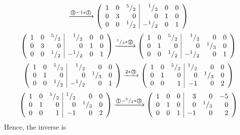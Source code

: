 \documentclass[8pt]{article} %
\begin{document}
\begin{enumerate}[1]
\begin{enumerate}[(a)]
\[\xrightarrow{\text{\textcircled{3}$-1*$\textcircled{1}}}\left(\begin{array}{rrr|rrr}
1&0&{^{5}/_{2}}&{^{1}/_{2}}&0&0\\
0&3&0&0&1&0\\
0&0&{^{1}/_{2}}&-{^{1}/_{2}}&0&1\\
\end{array}\right)
\]\[\left(\begin{array}{rrr|rrr}
1&0&{^{5}/_{2}}&{^{1}/_{2}}&0&0\\
0&3&0&0&1&0\\
0&0&{^{1}/_{2}}&-{^{1}/_{2}}&0&1\\
\end{array}\right)
\xrightarrow{\text{${^{1}/_{3}}*$\textcircled{2}}}\left(\begin{array}{rrr|rrr}
1&0&{^{5}/_{2}}&{^{1}/_{2}}&0&0\\
0&1&0&0&{^{1}/_{3}}&0\\
0&0&{^{1}/_{2}}&-{^{1}/_{2}}&0&1\\
\end{array}\right)
\]\[\left(\begin{array}{rrr|rrr}
1&0&{^{5}/_{2}}&{^{1}/_{2}}&0&0\\
0&1&0&0&{^{1}/_{3}}&0\\
0&0&{^{1}/_{2}}&-{^{1}/_{2}}&0&1\\
\end{array}\right)
\xrightarrow{\text{$2*$\textcircled{3}}}\left(\begin{array}{rrr|rrr}
1&0&{^{5}/_{2}}&{^{1}/_{2}}&0&0\\
0&1&0&0&{^{1}/_{3}}&0\\
0&0&1&-1&0&2\\
\end{array}\right)
\]\[\left(\begin{array}{rrr|rrr}
1&0&{^{5}/_{2}}&{^{1}/_{2}}&0&0\\
0&1&0&0&{^{1}/_{3}}&0\\
0&0&1&-1&0&2\\
\end{array}\right)
\xrightarrow{\text{\textcircled{1}$-{^{5}/_{2}}*$\textcircled{3}}}\left(\begin{array}{rrr|rrr}
1&0&0&3&0&-5\\
0&1&0&0&{^{1}/_{3}}&0\\
0&0&1&-1&0&2\\
\end{array}\right)
\]
Hence, the inverse is

\end{enumerate}
\end{enumerate}
\end{document}
